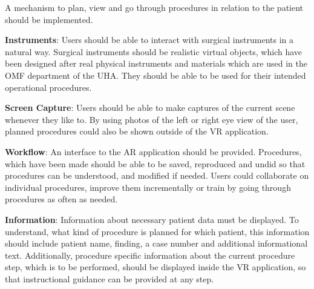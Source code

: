 \begin{compactenum}[label=(\textbf{\alph*})]
\begin{compactenum}[label=(\textbf{\alph*})]
        \item \label{req::F3.7}A mechanism to plan, view and go through procedures in relation to the patient should be implemented.  
    \end{compactenum}
    \item \label{req::F4}\textbf{Instruments}: Users should be able to interact with surgical instruments in a natural way.
    Surgical instruments should be realistic virtual objects, which have been designed after real physical instruments and materials which are used in the OMF department of the UHA.
    They should be able to be used for their intended operational procedures.
    \item \label{req::F5}\textbf{Screen Capture}: Users should be able to make captures of the current scene whenever they like to.
    By using photos of the left or right eye view of the user, planned procedures could also be shown outside of the VR application. 
    \item \label{req::F6}\textbf{Workflow}: An interface to the AR application should be provided.
    Procedures, which have been made should be able to be saved, reproduced and undid so that procedures can be understood, and modified if needed.
    Users could collaborate on individual procedures, improve them incrementally or train by going through procedures as often as needed.
    \item \label{req::F7}\textbf{Information}: Information about necessary patient data must be displayed.
    To understand, what kind of procedure is planned for which patient, this information should include patient name, finding, a case number and additional informational text.
    Additionally, procedure specific information about the current procedure step, which is to be performed, should be displayed inside the VR application, so that instructional guidance can 
    be provided at any step.
\end{compactenum}